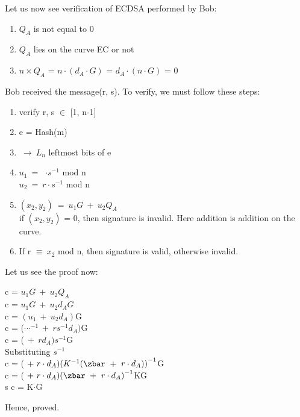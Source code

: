 \documentclass[11pt]{article}
\begin{document}
Let us now see verification of ECDSA performed by Bob:
\begin{enumerate}
    \item $Q_A$ is not equal to 0
    \item $Q_A$ lies on the curve EC or not
    \item $n\times Q_A$ = $n \cdot (d_A \cdot G)$ = $d_A \cdot (n \cdot G)$ = 0
\end{enumerate}
Bob received the message(r, s). To verify, we must follow these steps:
\begin{enumerate}
    \item verify r, s $\in$ [1, n-1]
    \item e = Hash(m)
    \item \zbar $\ \rightarrow\ L_n$ leftmost bits of e
    \item $u_1 \ =\ $ \zbar$\cdot s^{-1}$ mod n\\
    $u_2\ =\ r \cdot s^{-1}$ mod n
    \item $(x_2, y_2)\ =\ u_1G\ +\ u_2Q_A$\\
    if $(x_2, y_2)$ = 0, then signature is invalid. Here addition is addition on the curve.
    \item If r $\equiv\ x_2$ mod n, then signature is valid, otherwise invalid.
\end{enumerate}
Let us see the proof now:\\
\begin{center}
    c = $u_1G\ +\ u_2Q_A$\\
    \vspace{1mm}
    c = $u_1G\ +\ u_2d_AG$\\
    \vspace{1mm}
    c = $(u_1\ +\ u_2d_A)$G\\
    \vspace{1mm}
    c = (\zbar$\cdots^{-1}\ +\ rs^{-1}d_A)$G\\
    \vspace{1mm}
    c = (\zbar $\ +\ rd_A)s^{-1}$G\\
    \vspace{1mm}
    Substituting $s^{-1}$\\
    \vspace{1mm}
    c = (\zbar $\ +\ r\cdot d_A){(K^{-1}(\zbar\ +\ r\cdot d_A))}^{-1}$G\\
    \vspace{1mm}
    c = (\zbar $\ +\ r\cdot d_A){(\zbar\ +\ r \cdot d_A)}^{-1}$KG\\
    \vspace{1mm}s
    c = K$\cdot$G
\end{center}
Hence, proved.
\end{document}
